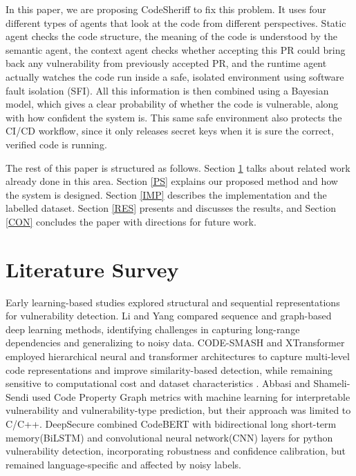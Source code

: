 \documentclass[conference]{IEEEtran}
\begin{document}
In this paper, we are proposing CodeSheriff to fix this problem. It uses four different types of agents that look at the code from different perspectives. Static agent checks the code structure, the meaning of the code is understood by the semantic agent, the context agent checks whether accepting this PR could bring back any vulnerability from previously accepted PR, and the runtime agent actually watches the code run inside a safe, isolated environment using software fault isolation (SFI). All this information is then combined using a Bayesian model, which gives a clear probability of whether the code is vulnerable, along with how confident the system is. This same safe environment also protects the CI/CD workflow, since it only releases secret keys when it is sure the correct, verified code is running.


The rest of this paper is structured as follows. Section \ref{LS} talks about related work already done in this area. Section \ref{PS} explains our proposed method and how the system is designed. Section \ref{IMP} describes the implementation and the labelled dataset. Section \ref{RES} presents and discusses the results, and Section \ref{CON} concludes the paper with directions for future work.

\section{Literature Survey} \label{LS}

Early learning-based studies explored structural and sequential representations for vulnerability detection. Li and Yang \cite{ref20} compared sequence and graph-based deep learning methods, identifying challenges in capturing long-range dependencies and generalizing to noisy data. CODE-SMASH \cite{ref19} and XTransformer \cite{ref18} employed hierarchical neural and transformer architectures to capture multi-level code representations and improve similarity-based detection, while remaining sensitive to computational cost and dataset characteristics . Abbasi and Shameli-Sendi \cite{ref4} used Code Property Graph metrics with machine learning for interpretable vulnerability and vulnerability-type prediction, but their approach was limited to C/C++. DeepSecure \cite{ref2} combined CodeBERT with bidirectional long short-term memory(BiLSTM) and convolutional neural network(CNN) layers for python vulnerability detection, incorporating robustness and confidence calibration, but remained language-specific and affected by noisy labels.
\end{document}
